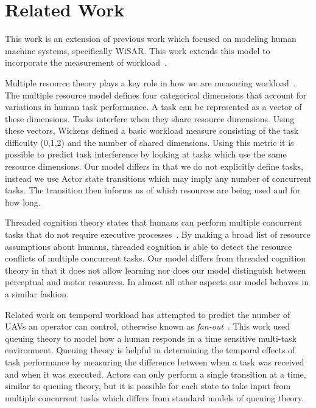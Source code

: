 \documentclass[letterpaper]{article}
\begin{document}
\section{Related Work}

This work is an extension of previous work which focused on modeling human
machine systems, specifically WiSAR.  This work extends this model to
incorporate the measurement of workload~\cite{gledhill2013modelinguas}.

Multiple resource theory plays a key role in how we are measuring workload~\cite{wickens2002multiple}. The multiple resource model defines four categorical dimensions that
account for variations in human task performance.  A task can be represented as a vector of these dimensions.  Tasks interfere when they share resource dimensions.  Using these vectors, Wickens defined a basic workload measure consisting of the task difficulty (0,1,2) and the number of shared dimensions.  Using this metric it is possible to predict task interference by looking at tasks which use the same resource dimensions.  Our model differs in that we do not explicitly define tasks, instead we use Actor state transitions which may imply any number of concurrent tasks.  The transition then informs us of which resources are being used and for how long.  

Threaded cognition theory states that humans can perform
multiple concurrent tasks that do not require executive processes~\cite{salvucci2008threaded}.  By making a
broad list of resource assumptions about humans, threaded cognition is able to
detect the resource conflicts of multiple concurrent tasks.  Our model differs from
threaded cognition theory in that it does not allow learning nor does our model distinguish
between perceptual and motor resources. In almost all other aspects our model behaves in a similar fashion.

Related work on temporal workload has attempted to predict the number of UAVs an operator can
control, otherwise known as {\em fan-out}~\cite{cummings2007predicting,OlsenWood2004,CrandallEtAl2005}.  This work used queuing theory
to model how a human responds in a time sensitive multi-task environment.  Queuing theory is helpful in determining the temporal effects of task performance by measuring the difference between when a task was received and when it was executed.  Actors can only perform a single transition at a time, similar to queuing theory, but it is possible for each state to take input from multiple concurrent tasks which differs from standard models of queuing theory.
\end{document}
